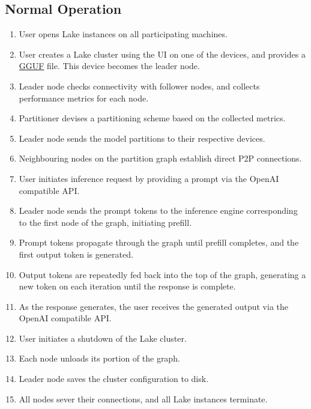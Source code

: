 \documentclass[12pt]{article}
\begin{document}
\subsection{Normal Operation}\label{subsec:normal-operation}
\begin{enumerate}
	\item User opens Lake instances on all participating machines.
    \item User creates a Lake cluster using the UI on one of the devices, and provides a
		\href{https://github.com/ggml-org/ggml/blob/master/docs/gguf.md}{GGUF} file. This
		device becomes the leader node.
	\item Leader node checks connectivity with follower nodes, and collects performance
		metrics for each node.
	\item Partitioner devises a partitioning scheme based on the collected metrics.
	\item Leader node sends the model partitions to their respective devices.
	\item Neighbouring nodes on the partition graph establish direct P2P connections.
	\item User initiates inference request by providing a prompt via the OpenAI compatible
		API.
	\item Leader node sends the prompt tokens to the inference engine corresponding to the
		first node of the graph, initiating prefill.
	\item Prompt tokens propagate through the graph until prefill completes, and the first
		output token is generated.
	\item Output tokens are repeatedly fed back into the top of the graph, generating a new token
		on each iteration until the response is complete.
	\item As the response generates, the user receives the generated output via the OpenAI compatible
		API.
	\item User initiates a shutdown of the Lake cluster.
	\item Each node unloads its portion of the graph.
	\item Leader node saves the cluster configuration to disk.
	\item All nodes sever their connections, and all Lake instances terminate.
\end{enumerate}
\end{document}
